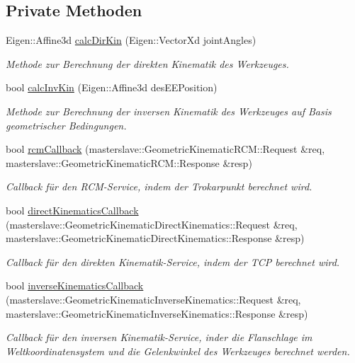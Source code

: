 \subsection*{Private Methoden}
\begin{DoxyCompactItemize}
\item 
Eigen\-::\-Affine3d \hyperlink{classGeometricKinematic_a30ba11c16e6394d094604a8914f97581}{calc\-Dir\-Kin} (Eigen\-::\-Vector\-Xd joint\-Angles)
\begin{DoxyCompactList}\small\item\em Methode zur Berechnung der direkten Kinematik des Werkzeuges. \end{DoxyCompactList}\item 
bool \hyperlink{classGeometricKinematic_a40340db367bf2e3b10830c6ac54be302}{calc\-Inv\-Kin} (Eigen\-::\-Affine3d des\-E\-E\-Position)
\begin{DoxyCompactList}\small\item\em Methode zur Berechnung der inversen Kinematik des Werkzeuges auf Basis geometrischer Bedingungen. \end{DoxyCompactList}\item 
bool \hyperlink{classGeometricKinematic_afd63d5511b3d37eeb2306cb81750e42b}{rcm\-Callback} (masterslave\-::\-Geometric\-Kinematic\-R\-C\-M\-::\-Request \&req, masterslave\-::\-Geometric\-Kinematic\-R\-C\-M\-::\-Response \&resp)
\begin{DoxyCompactList}\small\item\em Callback für den R\-C\-M-\/\-Service, indem der Trokarpunkt berechnet wird. \end{DoxyCompactList}\item 
bool \hyperlink{classGeometricKinematic_ab56c619011ffae14a04162ca09dcc70a}{direct\-Kinematics\-Callback} (masterslave\-::\-Geometric\-Kinematic\-Direct\-Kinematics\-::\-Request \&req, masterslave\-::\-Geometric\-Kinematic\-Direct\-Kinematics\-::\-Response \&resp)
\begin{DoxyCompactList}\small\item\em Callback für den direkten Kinematik-\/\-Service, indem der T\-C\-P berechnet wird. \end{DoxyCompactList}\item 
bool \hyperlink{classGeometricKinematic_ac32c435496ff486133d3aa4094edd2d5}{inverse\-Kinematics\-Callback} (masterslave\-::\-Geometric\-Kinematic\-Inverse\-Kinematics\-::\-Request \&req, masterslave\-::\-Geometric\-Kinematic\-Inverse\-Kinematics\-::\-Response \&resp)
\begin{DoxyCompactList}\small\item\em Callback für den inversen Kinematik-\/\-Service, inder die Flanschlage im Weltkoordinatensystem und die Gelenkwinkel des Werkzeuges berechnet werden. \end{DoxyCompactList}\item 

\end{DoxyCompactItemize}
